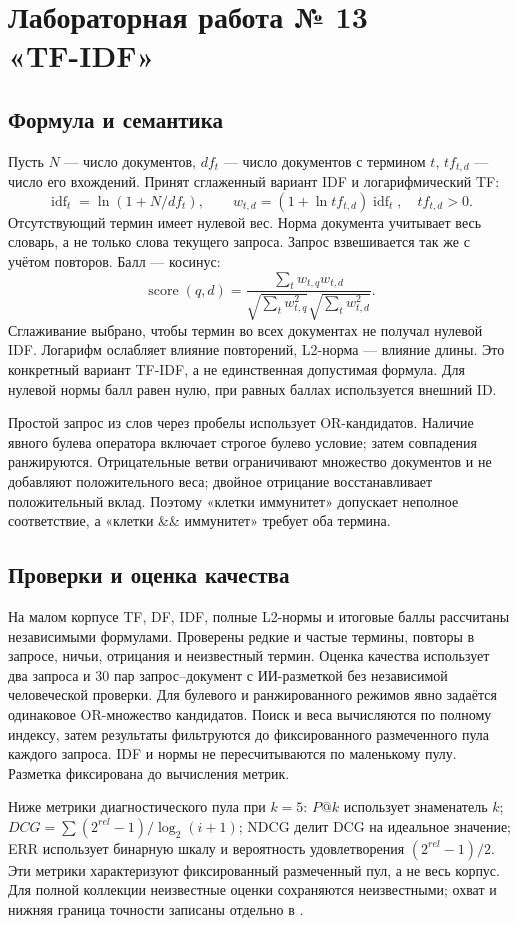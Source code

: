 \documentclass[12pt,a4paper]{article}
\newcommand{\code}[1]{\texttt{\detokenize{#1}}}
\newcommand{\sub}[1]{\subsection{#1}}
\begin{document}
\section{Лабораторная работа № 13\\«TF-IDF»}
\sub{Формула и семантика}
Пусть $N$ --- число документов, $df_t$ --- число документов с термином $t$, $tf_{t,d}$ --- число его вхождений. Принят сглаженный вариант IDF и логарифмический TF:
\[
\operatorname{idf}_t=\ln(1+N/df_t),\qquad
w_{t,d}=(1+\ln tf_{t,d})\operatorname{idf}_t,\quad tf_{t,d}>0.
\]
Отсутствующий термин имеет нулевой вес. Норма документа учитывает весь словарь, а не только слова текущего запроса. Запрос взвешивается так же с учётом повторов. Балл --- косинус:
\[
\operatorname{score}(q,d)=\frac{\sum_t w_{t,q}w_{t,d}}
{\sqrt{\sum_t w_{t,q}^2}\sqrt{\sum_t w_{t,d}^2}}.
\]
Сглаживание выбрано, чтобы термин во всех документах не получал нулевой IDF. Логарифм ослабляет влияние повторений, L2-норма --- влияние длины. Это конкретный вариант TF-IDF, а не единственная допустимая формула. Для нулевой нормы балл равен нулю, при равных баллах используется внешний ID.

Простой запрос из слов через пробелы использует OR-кандидатов. Наличие явного булева оператора включает строгое булево условие; затем совпадения ранжируются. Отрицательные ветви ограничивают множество документов и не добавляют положительного веса; двойное отрицание восстанавливает положительный вклад. Поэтому «клетки иммунитет» допускает неполное соответствие, а «клетки \&\& иммунитет» требует оба термина.
\sub{Проверки и оценка качества}
На малом корпусе TF, DF, IDF, полные L2-нормы и итоговые баллы рассчитаны независимыми формулами. Проверены редкие и частые термины, повторы в запросе, ничьи, отрицания и неизвестный термин. Оценка качества использует два запроса и 30 пар запрос--документ с ИИ-разметкой без независимой человеческой проверки. Для булевого и ранжированного режимов явно задаётся одинаковое OR-множество кандидатов. Поиск и веса вычисляются по полному индексу, затем результаты фильтруются до фиксированного размеченного пула каждого запроса. IDF и нормы не пересчитываются по маленькому пулу. Разметка фиксирована до вычисления метрик.

Ниже метрики диагностического пула при $k=5$: $P@k$ использует знаменатель $k$; $DCG=\sum(2^{rel}-1)/\log_2(i+1)$; NDCG делит DCG на идеальное значение; ERR использует бинарную шкалу и вероятность удовлетворения $(2^{rel}-1)/2$. Эти метрики характеризуют фиксированный размеченный пул, а не весь корпус. Для полной коллекции неизвестные оценки сохраняются неизвестными; охват и нижняя граница точности записаны отдельно в \code{lab13/results/quality.json}.
\end{document}
